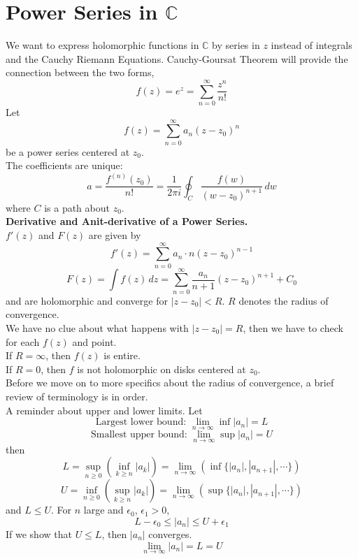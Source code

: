 \documentclass[11pt]{article}
\begin{document}
\newpage
\section{Power Series in $\mathbb{C}$}
We want to express holomorphic functions in $\mathbb{C}$ by series in $z$ instead of integrals and the Cauchy Riemann Equations. Cauchy-Goursat Theorem will provide the connection between the two forms, 
$$ f(z) = e^z = \sum_{n = 0}^{\infty} \frac{z^n}{n!} $$
Let 
$$ f(z) = \sum_{n = 0}^{\infty} a_n(z - z_0)^n $$
be a power series centered at $z_0$. \\
The coefficients are unique: 
$$ a = \frac{f^{(n)} (z_0)}{n!} = \frac{1}{2\pi i} \oint_C \frac{f(w)}{(w - z_0)^{n + 1}} \, dw$$
where $C$ is a path about $z_0$. \\
\newline
\textbf{Derivative and Anit-derivative of a Power Series.} \\
$f'(z)$ and $F(z)$ are given by 
$$f'(z) = \sum_{n = 0}^{\infty} a_n \cdot n(z-z_0)^{n -1}$$
$$F(z) = \int f(z) \, dz = \sum_{n = 0}^{\infty} \frac{a_n}{n + 1}(z - z_0)^{n + 1} + C_0$$
and are holomorphic and converge for $|z -z _0| < R$. $R$ denotes the radius of convergence. \\
We have no clue about what happens with $|z - z_0| = R$, then we have to check for each $f(z)$ and point. \\
If $R = \infty$, then $f(z)$ is entire. \\
If $R = 0$, then $f$ is not holomorphic on disks centered at $z_0$. \\
\newline
Before we move on to more specifics about the radius of convergence, a brief review of terminology is in order. \\ 
A reminder about upper and lower limits. Let 
\begin{equation*}
\mbox{Largest lower bound: } \lim_{n \to \infty} \inf|a_n| = L
\end{equation*}
\begin{equation*}
\mbox{Smallest upper bound: }\lim_{n \to \infty} \sup|a_n| = U
\end{equation*}
then 
$$ L = \sup_{n \geqslant 0}(\inf_{k \geqslant n}|a_k|) = \lim_{n \to \infty} (\inf \{ |a_n|, |a_{n + 1}|, \cdots \})$$
$$ U = \inf_{n \geqslant 0}(\sup_{k \geqslant n}|a_k|) = \lim_{n \to \infty} (\sup \{ |a_n|, |a_{n + 1}|, \cdots \}) $$
and $L \leqslant U$. For $n$ large and $\epsilon_0$, $\epsilon_1 > 0$, 
$$L - \epsilon_0 \leqslant |a_n| \leqslant U + \epsilon_1$$
If we show that $U \leqslant L$, then $|a_n|$ converges.
$$\lim_{n \to \infty}|a_n| = L = U$$ 
\newline
\end{document}

